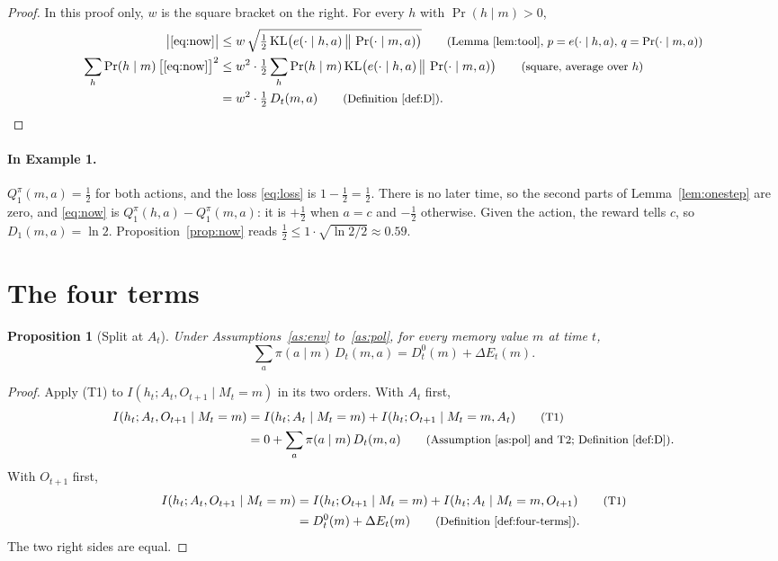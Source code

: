 \documentclass{article}
\newtheorem{proposition}{Proposition}[section]
\theoremstyle{definition}
\newcommand{\KL}{\mathrm{KL}}
\newcommand{\dE}{\Delta E}
\newcommand{\why}[1]{\tag*{\small(#1)}}
\begin{document}
\begin{proof}
In this proof only, $w$ is the square bracket on the right. For every $h$ with $\Pr(h\mid m)>0$,
\begin{align*}
\big|\eqref{eq:now}\big|&\le w\,\sqrt{\tfrac12\,\KL\big(e(\cdot\mid h,a)\,\big\|\,\Pr(\cdot\mid m,a)\big)} \why{Lemma~\ref{lem:tool}, $p=e(\cdot\mid h,a)$, $q=\Pr(\cdot\mid m,a)$}\\
\sum_h\Pr(h\mid m)\,\big[\eqref{eq:now}\big]^2&\le w^2\cdot\tfrac12\sum_h\Pr(h\mid m)\,\KL\big(e(\cdot\mid h,a)\,\big\|\,\Pr(\cdot\mid m,a)\big) \why{square, average over $h$}\\
&=w^2\cdot\tfrac12\,D_t(m,a) \why{Definition~\ref{def:D}}.
\end{align*}
\end{proof}

\paragraph{In Example 1.} $Q^\pi_1(m,a)=\tfrac12$ for both actions, and the loss \eqref{eq:loss} is $1-\tfrac12=\tfrac12$. There is no later time, so the second parts of Lemma~\ref{lem:onestep} are zero, and \eqref{eq:now} is $Q^\pi_1(h,a)-Q^\pi_1(m,a)$: it is $+\tfrac12$ when $a=c$ and $-\tfrac12$ otherwise. Given the action, the reward tells $c$, so $D_1(m,a)=\ln2$. Proposition~\ref{prop:now} reads $\tfrac12\le1\cdot\sqrt{\ln2/2}\approx0.59$.

\section{The four terms}\label{sec:layer3}

\begin{proposition}[Split at $A_t$]\label{prop:split1}
Under Assumptions~\ref{as:env} to~\ref{as:pol}, for every memory value $m$ at time $t$,
\[
\sum_a\pi(a\mid m)\,D_t(m,a)=D^0_t(m)+\dE_t(m).
\]
\end{proposition}

\begin{proof}
Apply (T1) to $I(h_t;A_t,O_{t+1}\mid M_t=m)$ in its two orders. With $A_t$ first,
\begin{align*}
I(h_t;A_t,O_{t+1}\mid M_t=m)&=I(h_t;A_t\mid M_t=m)+I(h_t;O_{t+1}\mid M_t=m,A_t) \why{T1}\\
&=0+\sum_a\pi(a\mid m)\,D_t(m,a) \why{Assumption~\ref{as:pol} and T2; Definition~\ref{def:D}}.
\end{align*}
With $O_{t+1}$ first,
\begin{align*}
I(h_t;A_t,O_{t+1}\mid M_t=m)&=I(h_t;O_{t+1}\mid M_t=m)+I(h_t;A_t\mid M_t=m,O_{t+1}) \why{T1}\\
&=D^0_t(m)+\dE_t(m) \why{Definition~\ref{def:four-terms}}.
\end{align*}
The two right sides are equal.
\end{proof}
\end{document}
